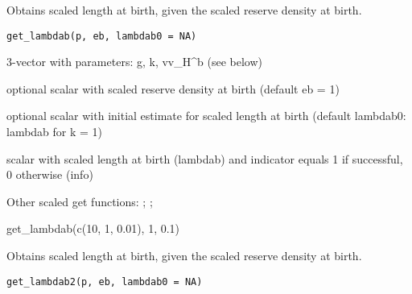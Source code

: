\documentclass[a4paper]{book}
\begin{document}
%
\begin{Description}\relax
Obtains scaled length at birth, given the scaled reserve density at birth.
\end{Description}
%
\begin{Usage}
\begin{verbatim}
get_lambdab(p, eb, lambdab0 = NA)
\end{verbatim}
\end{Usage}
%
\begin{Arguments}
\begin{ldescription}
\item[\code{p}] 3-vector with parameters: g, k, vv\_H\textasciicircum{}b (see below)

\item[\code{eb}] optional scalar with scaled reserve density at birth (default eb = 1)

\item[\code{lambdab0}] optional scalar with initial estimate for scaled length at birth (default lambdab0: lambdab for k = 1)
\end{ldescription}
\end{Arguments}
%
\begin{Value}
scalar with scaled length at birth (lambdab) and indicator equals 1 if successful, 0 otherwise (info)
\end{Value}
%
\begin{SeeAlso}\relax
Other scaled get functions: ;
; 
\end{SeeAlso}
%
\begin{Examples}
\begin{ExampleCode}
get_lambdab(c(10, 1, 0.01), 1, 0.1)
\end{ExampleCode}
\end{Examples}
%
\begin{Description}\relax
Obtains scaled length at birth, given the scaled reserve density at birth.
\end{Description}
%
\begin{Usage}
\begin{verbatim}
get_lambdab2(p, eb, lambdab0 = NA)
\end{verbatim}
\end{Usage}
\end{document}

